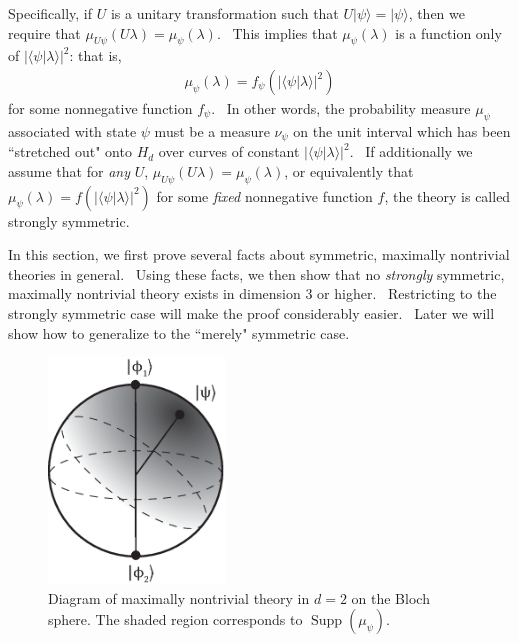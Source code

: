 \documentclass[letterpaper,11pt]{article}
\DeclareMathOperator{\supp}{Supp}
\begin{document}
Specifically, if $U$ is a unitary transformation such that $U | \psi
\rangle = | \psi \rangle $, then we require that $%
\mu_{U\psi}(U\lambda)=\mu_{\psi}(\lambda)$. \ This implies that $%
\mu_{\psi}(\lambda)$ is a function only of $| \langle \psi | \lambda
\rangle |^2$: that is,
\begin{eqnarray}
\mu_{\psi}(\lambda)=f_{\psi}\left(| \langle \psi | \lambda \rangle %
|^2\right)
\end{eqnarray}
for some nonnegative function $f_{\psi}$. \ In other words, the probability
measure $\mu_\psi$ associated with state $\psi$ must be a measure $\nu_\psi$
on the unit interval which has been ``stretched out" onto $H_d$ over curves
of constant $|\langle \psi | \lambda \rangle |^2$. \ If additionally we assume that for \emph{any} $U$, $\mu_{U\psi}(U\lambda)=\mu_{\psi}(\lambda)$, or equivalently that $\mu_{\psi}(\lambda)=f\left(| \langle \psi | \lambda \rangle %
|^2\right)
$
for some \emph{fixed} nonnegative function $f$, the theory is called strongly symmetric.

In this section, we first prove several facts about symmetric, maximally nontrivial theories in general. \ Using these facts, we then show that no \emph{strongly} symmetric, maximally nontrivial theory exists in dimension 3 or higher. \ Restricting to the strongly symmetric case will make the proof considerably easier. \ Later we will show how to generalize to the ``merely" symmetric case.




\begin{figure}[h] \centering
\includegraphics[height=6cm]{figks2.eps} \vspace{-20pt}
\caption{Diagram of maximally nontrivial theory in $d=2$ on the Bloch sphere. The shaded region corresponds to $\supp(\mu_{\psi})$.} \label{figks}
\end{figure}
\end{document}
